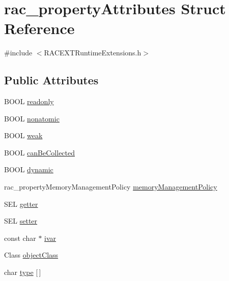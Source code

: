 \hypertarget{structrac__property_attributes}{}\section{rac\+\_\+property\+Attributes Struct Reference}
\label{structrac__property_attributes}


{\ttfamily \#include $<$R\+A\+C\+E\+X\+T\+Runtime\+Extensions.\+h$>$}

\subsection*{Public Attributes}
\begin{DoxyCompactItemize}
\item 
B\+O\+OL \mbox{\hyperlink{structrac__property_attributes_abb7d2cfe35836a37e19bba2982a9f063}{readonly}}
\item 
B\+O\+OL \mbox{\hyperlink{structrac__property_attributes_a3bef2ed70200ccc5d4ca48613e49ab2a}{nonatomic}}
\item 
B\+O\+OL \mbox{\hyperlink{structrac__property_attributes_ad5781075af21b27167f149d755de00f6}{weak}}
\item 
B\+O\+OL \mbox{\hyperlink{structrac__property_attributes_ab0d64d842154116da09678bd4959e337}{can\+Be\+Collected}}
\item 
B\+O\+OL \mbox{\hyperlink{structrac__property_attributes_acd179d0b198fbaa34ff802b4f8e6a762}{dynamic}}
\item 
rac\+\_\+property\+Memory\+Management\+Policy \mbox{\hyperlink{structrac__property_attributes_a7a204711220b63a21ced867e5eb173df}{memory\+Management\+Policy}}
\item 
S\+EL \mbox{\hyperlink{structrac__property_attributes_a57d596adf835ce2ac623b8454d007d4d}{getter}}
\item 
S\+EL \mbox{\hyperlink{structrac__property_attributes_ab23ef6a9f0a4efe6546a63ff716556ae}{setter}}
\item 
const char $\ast$ \mbox{\hyperlink{structrac__property_attributes_ae91fbfecdff5d2e465a1a6f6b784d9bd}{ivar}}
\item 
Class \mbox{\hyperlink{structrac__property_attributes_a73053fdbc4bc9014ccb6148b05b74521}{object\+Class}}
\item 
char \mbox{\hyperlink{structrac__property_attributes_a977dc6d9be17be26f0969e0eef2c79ae}{type}} \mbox{[}$\,$\mbox{]}
\end{DoxyCompactItemize}


